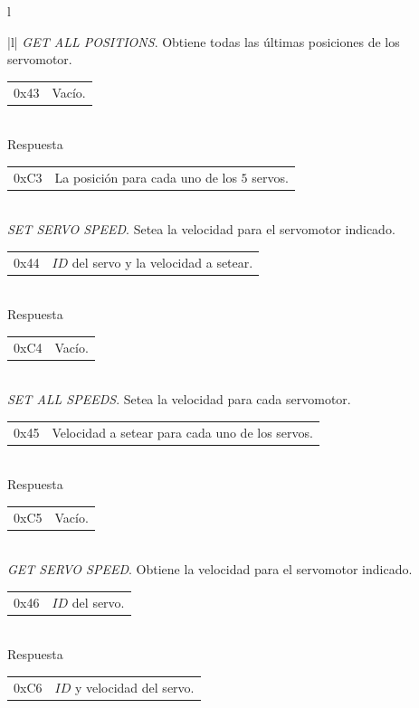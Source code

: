 \begin{table}
\begin{center}
\begin{tabular}{l}
\begin{tabular}{|l|}
				\hline\hline
				\emph{GET ALL POSITIONS}. Obtiene todas las \'ultimas posiciones de los servomotor. \\
				\hline
				\begin{tabular}{c|l}
					0x43 & Vac\'io. \\
				\end{tabular}
				\\
				\hline
				Respuesta \\
				\hline
				\begin{tabular}{c|l}
					0xC3 & La posici\'on para cada uno de los $5$ servos.\\
				\end{tabular}
				\\
	
				\hline\hline
				\emph{SET SERVO SPEED}. Setea la velocidad para el servomotor indicado. \\
				\hline
				\begin{tabular}{c|l}
					0x44 & $ID$ del servo y la velocidad a setear. \\
				\end{tabular}
				\\
				\hline
				Respuesta \\
				\hline
				\begin{tabular}{c|l}
					0xC4 & Vac\'io. \\
				\end{tabular}
				\\
	
				\hline\hline
				\emph{SET ALL SPEEDS}. Setea la velocidad para cada servomotor. \\
				\hline
				\begin{tabular}{c|l}
					0x45 & Velocidad a setear para cada uno de los servos. \\
				\end{tabular}
				\\
				\hline
				Respuesta \\
				\hline
				\begin{tabular}{c|l}
					0xC5 & Vac\'io. \\
				\end{tabular}
				\\

				\hline\hline
				\emph{GET SERVO SPEED}. Obtiene la velocidad para el servomotor indicado. \\
				\hline
				\begin{tabular}{c|l}
					0x46 & $ID$ del servo.\\
				\end{tabular}
				\\
				\hline
				Respuesta \\
				\hline
				\begin{tabular}{c|l}
					0xC6 & $ID$ y velocidad del servo. \\
				\end{tabular}
				\\
	

\end{tabular}
\end{tabular}
\end{center}
\end{table}
